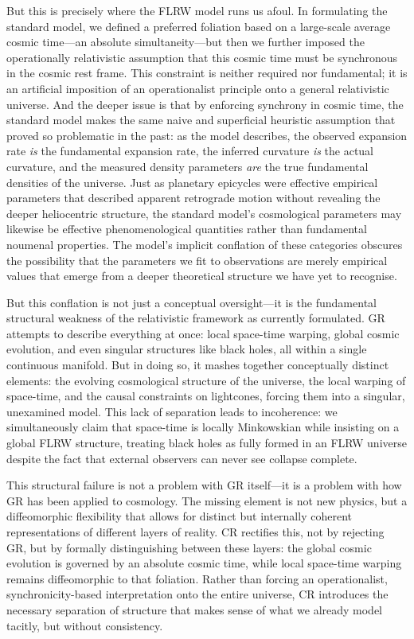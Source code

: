 \documentclass[aps,prd,reprint,superscriptaddress]{revtex4-2}
\begin{document}
But this is precisely where the FLRW model runs us afoul. In formulating the standard model, we defined a preferred foliation based on a large-scale average cosmic time---an absolute simultaneity---but then we further imposed the operationally relativistic assumption that this cosmic time must be synchronous in the cosmic rest frame. This constraint is neither required nor fundamental; it is an artificial imposition of an operationalist principle onto a general relativistic universe. And the deeper issue is that by enforcing synchrony in cosmic time, the standard model makes the same naive and superficial heuristic assumption that proved so problematic in the past: as the model describes, the observed expansion rate \textit{is} the fundamental expansion rate, the inferred curvature \textit{is} the actual curvature, and the measured density parameters \textit{are} the true fundamental densities of the universe. Just as planetary epicycles were effective empirical parameters that described apparent retrograde motion without revealing the deeper heliocentric structure, the standard model's cosmological parameters may likewise be effective phenomenological quantities rather than fundamental noumenal properties. The model's implicit conflation of these categories obscures the possibility that the parameters we fit to observations are merely empirical values that emerge from a deeper theoretical structure we have yet to recognise.

But this conflation is not just a conceptual oversight---it is the fundamental structural weakness of the relativistic framework as currently formulated. GR attempts to describe everything at once: local space-time warping, global cosmic evolution, and even singular structures like black holes, all within a single continuous manifold. But in doing so, it mashes together conceptually distinct elements: the evolving cosmological structure of the universe, the local warping of space-time, and the causal constraints on lightcones, forcing them into a singular, unexamined model. This lack of separation leads to incoherence: we simultaneously claim that space-time is locally Minkowskian while insisting on a global FLRW structure, treating black holes as fully formed in an FLRW universe despite the fact that external observers can never see collapse complete.

This structural failure is not a problem with GR itself---it is a problem with how GR has been applied to cosmology. The missing element is not new physics, but a diffeomorphic flexibility that allows for distinct but internally coherent representations of different layers of reality. CR rectifies this, not by rejecting GR, but by formally distinguishing between these layers: the global cosmic evolution is governed by an absolute cosmic time, while local space-time warping remains diffeomorphic to that foliation. Rather than forcing an operationalist, synchronicity-based interpretation onto the entire universe, CR introduces the necessary separation of structure that makes sense of what we already model tacitly, but without consistency.
\end{document}
